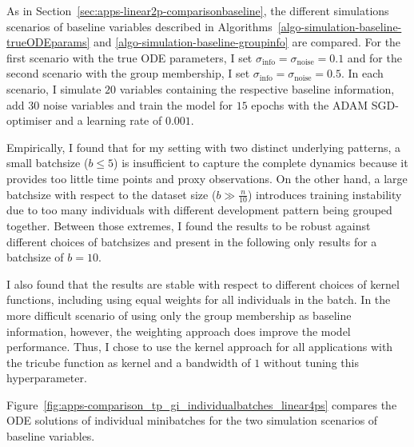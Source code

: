As in Section~\ref{sec:apps-linear2p-comparisonbaseline}, the different simulations scenarios of baseline variables described in Algorithms~\ref{algo-simulation-baseline-trueODEparams} and \ref{algo-simulation-baseline-groupinfo} are compared. For the first scenario with the true ODE parameters, I set $\sigma_{\mathrm{info}} = \sigma_{\mathrm{noise}} = 0.1$ and for the second scenario with the group membership, I set $\sigma_{\mathrm{info}} = \sigma_{\mathrm{noise}} = 0.5$. In each scenario, I simulate $20$ variables containing the respective baseline information, add $30$ noise variables and train the model for $15$ epochs with the ADAM SGD-optimiser and a learning rate of $0.001$. 

Empirically, I found that for my setting with two distinct underlying patterns, a small batchsize ($b \leq 5$) is insufficient to capture the complete dynamics because it provides too little time points and proxy observations. On the other hand, a large batchsize with respect to the dataset size ($b \gg \frac{n}{10}$) introduces training instability due to too many individuals with different development pattern being grouped together.
Between those extremes, I found the results to be robust against different choices of batchsizes and present in the following only results for a batchsize of $b=10$. 

I also found that the results are stable with respect to different choices of kernel functions, including using equal weights for all individuals in the batch. 
In the more difficult scenario of using only the group membership as baseline information, however, the weighting approach does improve the model performance. Thus, I chose to use the kernel approach for all applications with the tricube function as kernel and a bandwidth of $1$ without tuning this hyperparameter.

Figure~\ref{fig:apps-comparison_tp_gi_individualbatches_linear4ps} compares the ODE solutions of individual minibatches for the two simulation scenarios of baseline variables. 


